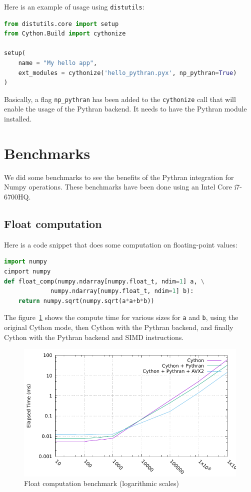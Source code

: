 \documentclass{deliverablereport}
\begin{document}
Here is an example of usage using {\tt distutils}:

\begin{lstlisting}[language=python]
from distutils.core import setup
from Cython.Build import cythonize

setup(
    name = "My hello app",
    ext_modules = cythonize('hello_pythran.pyx', np_pythran=True)
)
\end{lstlisting}

Basically, a flag {\tt np\_pythran} has been added to the {\tt cythonize} call
that will enable the usage of the Pythran backend. It needs to have the Pythran
module installed.

\section{Benchmarks}

We did some benchmarks to see the benefits of the Pythran integration for Numpy
operations. These benchmarks have been done using an Intel Core i7-6700HQ.

\subsection{Float computation}

Here is a code snippet that does some computation on floating-point values:

\begin{lstlisting}[language=python]
import numpy
cimport numpy
def float_comp(numpy.ndarray[numpy.float_t, ndim=1] a, \
             numpy.ndarray[numpy.float_t, ndim=1] b):
    return numpy.sqrt(numpy.sqrt(a*a+b*b))
\end{lstlisting}

The figure~\ref{fig:float_bench} shows the compute time for various sizes for
{\tt a} and {\tt b}, using the original Cython mode, then Cython with the
Pythran backend, and finally Cython with the Pythran backend and SIMD
instructions.

\begin{figure}[h]
  \caption{\label{fig:float_bench} Float computation benchmark (logarithmic scales)}
  \includegraphics{benchs/float/graph.pdf}
\end{figure}
\end{document}
